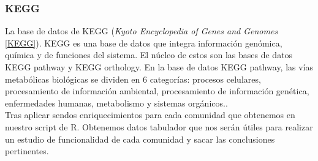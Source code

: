 \subsubsection{KEGG}
La base de datos de KEGG (\textit{Kyoto Encyclopedia of Genes and Genomes} \ref{KEGG}). KEGG es una base de datos que integra información genómica, química y de funciones del sistema. El núcleo de estos son las bases de datos KEGG pathway y KEGG orthology. En la base de datos KEGG pathway, las vías metabólicas biológicas se dividen en 6 categorías: procesos celulares, procesamiento de información ambiental, procesamiento de información genética, enfermedades humanas, metabolismo y sistemas orgánicos.\cite{KEGGpathway}. \\

Tras aplicar sendos enriquecimientos para cada comunidad que obtenemos en nuestro script de R. Obtenemos datos tabulador que nos serán útiles para realizar un estudio de funcionalidad de cada comunidad y sacar las conclusiones pertinentes.